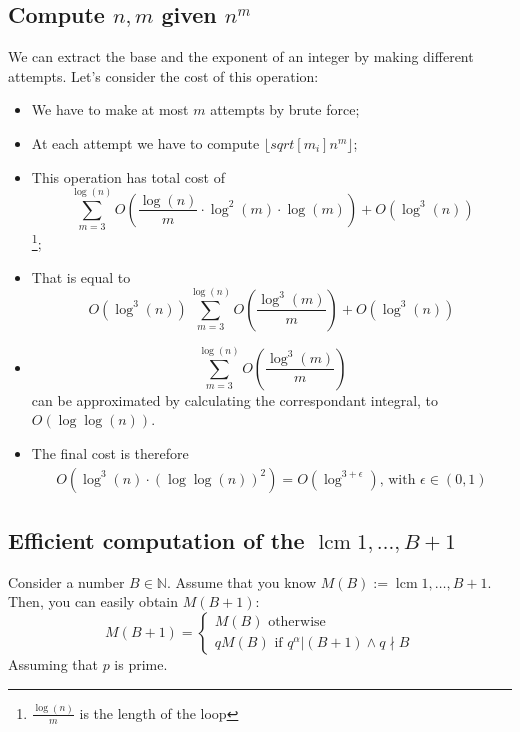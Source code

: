 \subsection{Compute $n, m$ given $n^{m}$}
We can extract the base and the exponent of an integer by making different attempts.\newline
Let's consider the cost of this operation:
\begin{itemize}
    \item We have to make at most $m$ attempts by brute force;
    \item At each attempt we have to compute $\lfloor sqrt[m_{i}]{n^{m}} \rfloor$;
    \item This operation has total cost of \[\sum_{m=3}^{\operatorname{log}(n)} O(\frac{\operatorname{log}(n)}{m} \cdot \operatorname{log}^{2}(m) \cdot \operatorname{log}(m)) + O(\operatorname{log}^{3}(n))\]\footnote{$\frac{\operatorname{log}(n)}{m}$ is the length of the loop};
    \item That is equal to \[O(\operatorname{log}^{3}(n)) \sum_{m=3}^{\operatorname{log}(n)} O(\frac{\operatorname{log}^{3}(m)}{m}) + O(\operatorname{log}^{3}(n))\]
    \item \[\sum_{m=3}^{\operatorname{log}(n)} O(\frac{\operatorname{log}^{3}(m)}{m})\] can be approximated by calculating the correspondant integral, to $O(\operatorname{log}\operatorname{log}(n))$.
    \item The final cost is therefore
    \begin{align*}
        O(\operatorname{log}^{3}(n) \cdot(\operatorname{log}\operatorname{log}(n))^{2})
        = O(\operatorname{log}^{3 + \epsilon}) \text{, with } \epsilon \in (0,1)
    \end{align*}
\end{itemize}

\subsection{Efficient computation of the $\operatorname{lcm}{1, \dots, B + 1}$}
Consider a number $B \in \mathbb{N}$. Assume that you know $M(B) := \operatorname{lcm}{1, \dots, B + 1}$. Then, you can easily obtain $M(B+1)$:
\[
M(B + 1) =
     \begin{cases}
       M(B) \text{ otherwise } \\
       q M(B) \text{ if } q^{\alpha}|(B+1) \land q \nmid B
     \end{cases}
\]
Assuming that $p$ is prime.

